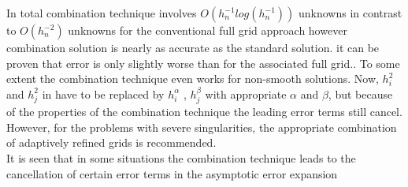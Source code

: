 In total combination technique involves $O({h}^{-1}_nlog({h}^{-1}_n))$  unknowns in contrast to $O({h}^{-2}_n) $ unknowns for the conventional full grid approach however combination solution is nearly as accurate as the standard solution. it can be proven that error is only slightly worse than for the associated full grid.\cite{Griebel1992a, Griebel1992b}. To some extent the combination technique even works for non-smooth solutions. Now, ${h}^2_i$ and ${h}^2_j$ in have to be replaced by ${h}^\alpha_i$ , ${h}^\beta_j$ with appropriate $\alpha$ and $\beta$, but because of the properties of the combination technique the leading error terms still cancel. However, for the problems with severe singularities, the appropriate combination of adaptively refined grids is recommended.\cite{Griebel1992a}\\ It is seen that in some situations the combination technique leads to the cancellation of certain error terms in the asymptotic error expansion\cite{Griebel1992b} \\

